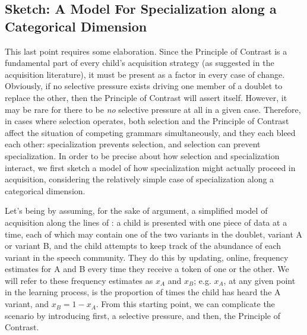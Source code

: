 \subsection{Sketch: A Model For Specialization along a Categorical Dimension}
\label{catspec}

This last point requires some elaboration.
Since the Principle of Contrast is a fundamental part of every child's acquisition strategy (as suggested in the acquisition literature), it must be present as a factor in every case of change.
Obviously, if no selective pressure exists driving one member of a doublet to replace the other, then the Principle of Contrast will assert itself.
However, it may be rare for there to be \textsl{no} selective pressure at all in a given case.
Therefore, in cases where selection operates, both selection and the Principle of Contrast affect the situation of competing grammars simultaneously, and they each bleed each other: specialization prevents selection, and selection can prevent specialization.
In order to be precise about how selection and specialization interact, we first sketch a model of how specialization might actually proceed in acquisition, considering the relatively simple case of specialization along a categorical dimension.

Let's being by assuming, for the sake of argument, a simplified model of acquisition along the lines of \citet{yang2000,yang2002}: a child is presented with one piece of data at a time, each of which may contain one of the two variants in the doublet, variant A or variant B, and the child attempts to keep track of the abundance of each variant in the speech community.
They do this by updating, online, frequency estimates for A and B every time they receive a token of one or the other.
We will refer to these frequency estimates as $x_A$ and $x_B$; e.g. $x_A$, at any given point in the learning process, is the proportion of times the child has heard the A variant, and $x_B = 1-x_A$.
From this starting point, we can complicate the scenario by introducing first, a selective pressure, and then, the Principle of Contrast.

